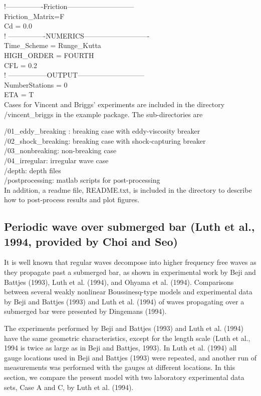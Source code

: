 \documentclass[11pt]{article}
\begin{document}
!----------------Friction-----------------------------  \\
Friction\_Matrix=F  \\
Cd = 0.0 \\

! ----------------NUMERICS---------------------------- \\
Time\_Scheme = Runge\_Kutta \\
HIGH\_ORDER = FOURTH \\
CFL = 0.2 \\

! -----------------OUTPUT----------------------------- \\
NumberStations = 0  \\
ETA = T  \\

Cases for Vincent and Briggs' experiments are included in the directory /vincent\_briggs in the example package. The sub-directories are

/01\_eddy\_breaking : breaking case with eddy-viscosity breaker \\
/02\_shock\_breaking: breaking case with shock-capturing breaker \\
/03\_nonbreaking: non-breaking case \\
/04\_irregular: irregular wave case \\
/depth: depth files \\
/postprocessing: matlab scripts for post-processing \\

In addition, a readme file, README.txt, is included in the directory to describe how to post-process results and plot figures. 


\subsection{Periodic wave over submerged bar (Luth et al., 1994, provided by Choi and Seo)}

It is well known that regular waves decompose into higher frequency free waves as they propagate past a submerged bar, as shown in experimental work by Beji and Battjes (1993), Luth et al. (1994), and Ohyama et al. (1994). Comparisons between several weakly nonlinear Boussinesq-type models and experimental data by Beji and Battjes (1993) and Luth et al. (1994) of waves propagating over a submerged bar were presented by Dingemans (1994).  

The experiments performed by Beji and Battjes (1993) and Luth et al. (1994) have the same geometric characteristics, except for the length scale (Luth et al., 1994 is twice as large as in Beji and Battjes, 1993). In Luth et al. (1994) all gauge locations used in Beji and Battjes (1993) were repeated, and another run of measurements was performed with the gauges at different locations.
In this section, we compare the present model with two laboratory experimental data sets, Case A and C,  by Luth et al. (1994).  
\end{document}
